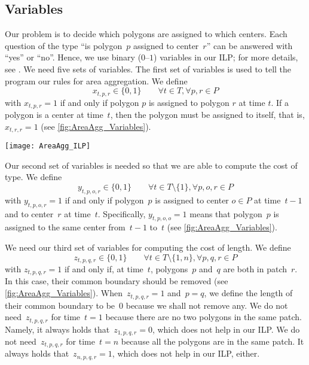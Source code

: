 \subsection{Variables}
\label{sub:variables}

Our problem is to decide 
which polygons are assigned to which centers.
Each question of the type 
``is polygon~$p$ assigned to center~$r$''
can be answered with ``yes'' or ``no''.
Hence, we use binary ($0$--$1$) variables in our ILP;
for more details, see \textcite[chapter~9]{bradley1977applied}.
We need five sets of variables.
%
The first set of variables is used to tell the program 
our rules for area aggregation.
We define 
$$
x_{t,p,r}\in \{0,1\} \qquad 
\forall t\in T, \forall p,r \in P 
$$
with $x_{t,p,r}=1$ if and only if 
polygon $p$ is assigned to polygon $r$ at time $t$. 
If a polygon is a center at time~$t$, 
then the polygon must be assigned to itself, 
that is, $x_{t,r,r}=1$
(see \fig\ref{fig:AreaAgg_Variables}).

\begin{figure*}[tb]
	\centering
	\texttt{[image: AreaAgg\_ILP]}
	\caption{Some examples of variables~$x_{t,p,r}$, 
		$y_{t,p,o,r}$, and~$z_{t,p,q,r}$. 
	}
	\label{fig:AreaAgg_Variables}
\end{figure*}


Our second set of variables is needed 
so that we are able to compute the cost of type.
We define 
$$
y_{t,p,o,r}\in \{0,1\} \qquad 
\forall t\in T\setminus \{1\}, \forall p,o,r \in P 
$$
with $y_{t,p,o,r}=1$ if and only if 
polygon~$p$ is assigned to center $o\in P$ at time~$t-1$ 
and to center~$r$ at time~$t$.
Specifically, $y_{t,p,o,o}=1$ means that
polygon~$p$ is assigned to the same center 
from~$t-1$ to~$t$ 
(see \fig\ref{fig:AreaAgg_Variables}).

We need our third set of variables 
for computing the cost of length.
We define 
$$
z_{t,p,q,r}\in \{0,1\} \qquad 
\forall t\in T\setminus \{1,n\}, \forall p,q,r \in P 
$$
with $z_{t,p,q,r}=1$ if and only if, at time~$t$,
polygons~$p$ and~$q$ are both in patch~$r$.
In this case, their common boundary should be removed
(see \fig\ref{fig:AreaAgg_Variables}).
When~$z_{t,p,q,r}=1$ and~$p=q$,
we define the length of their common boundary to be~$0$ 
because we shall not remove any.
We do not need~$z_{t,p,q,r}$ for time~$t=1$ 
because there are no two polygons in the same patch.
Namely, it always holds that~$z_{1,p,q,r}=0$, 
which does not help in our ILP.
We do not need~$z_{t,p,q,r}$ for time~$t=n$
because all the polygons are in the same patch.
It always holds that~$z_{n,p,q,r}=1$, 
which does not help in our ILP, either.

